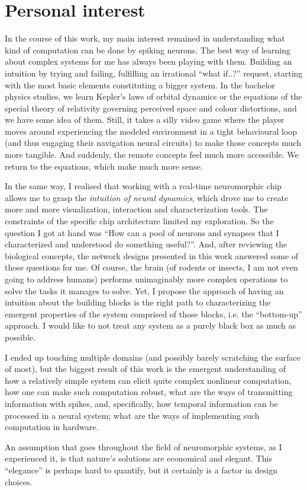 \section{Personal interest}

In the course of this work, my main interest remained in understanding what kind of computation can be done by spiking neurons. The best way of learning about complex systems for me has always been playing with them. Building an intuition by trying and failing, fulfilling an irrational ``what if..?'' request, starting with the most basic elements constituting a bigger system. In the bachelor physics studies, we learn Kepler's laws of orbital dynamics or the equations of the special theory of relativity governing perceived space and colour distortions, and we have some idea of them. Still, it takes a silly video game where the player moves around experiencing the modeled environment in a tight behavioural loop (and thus engaging their navigation neural circuits) to make those concepts much more tangible. And suddenly, the remote concepts feel much more accessible. We return to the equations, which make much more sense.

In the same way, I realised that working with a real-time neuromorphic chip allows me to grasp the \emph{intuition of neural dynamics}, which drove me to create more and more visualization, interaction and characterization tools. The constraints of the specific chip architecture limited my exploration. So the question I got at hand was ``How can a pool of neurons and synapses that I characterized and understood do something useful?''. And, after reviewing the biological concepts, the network designs presented in this work answered some of those questions for me. Of course, the brain (of rodents or insects, I am not even going to address humans) performs unimaginably more complex operations to solve the tasks it manages to solve. Yet, I propose the approach of having an intuition about the building blocks is the right path to characterizing the emergent properties of the system comprised of those blocks, i.e. the ``bottom-up'' approach. I would like to not treat any system as a purely black box as much as possible.

I ended up touching multiple domains (and possibly barely scratching the surface of most), but the biggest result of this work is the emergent understanding of how a relatively simple system can elicit quite complex nonlinear computation, how one can make such computation robust, what are the ways of transmitting information with spikes, and, specifically, how temporal information can be processed in a neural system; what are the ways of implementing such computation in hardware.

An assumption that goes throughout the field of neuromorphic systems, as I experienced it, is that nature's solutions are economical and elegant. This ``elegance'' is perhaps hard to quantify, but it certainly is a factor in design choices.
